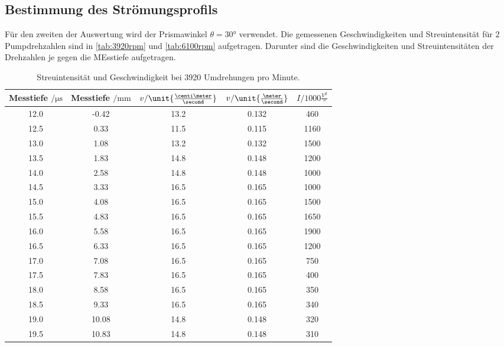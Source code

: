 \subsection{Bestimmung des Strömungsprofils}  
\label{sec:Profil}

Für den zweiten der Auswertung wird der Prismawinkel $\theta =30°$ verwendet. Die gemessenen Geschwindigkeiten und Streuintensität für 2 Pumpdrehzahlen sind in \autoref{tab:3920rpm} und \autoref{tab:6100rpm} aufgetragen.
Darunter sind die Geschwindigkeiten und Streuintensitäten der Drehzahlen je gegen die MEsstiefe aufgetragen.
 \begin{table}
     \centering
     \caption{Streuintensität und Geschwindigkeit bei 3920 Umdrehungen pro Minute.}
     \begin{tabular}{c c c c c}
         \toprule
         Messtiefe $ \mathrm{/} \unit{\micro \second}$ &  Messtiefe $ \mathrm{/} \unit{\milli \meter}$ & $v \mathrm{/} \unit{\frac{\centi \meter}{\second}}$ & $v \mathrm{/} \unit{\frac{\meter}{\second}}$ & $I \mathrm{/} 1000\unit{\frac{V^2}{\second}}$\\
         \midrule
         12.0 &  -0.42 &  13.2 &  0.132 &  460\\
         12.5 &  0.33 &  11.5 &  0.115 &  1160\\
         13.0 &  1.08 &  13.2 &  0.132 &  1500\\
         13.5 &  1.83 &  14.8 &  0.148 &  1200\\
         14.0 &  2.58 &  14.8 &  0.148 &  1000\\
         14.5 &  3.33 &  16.5 &  0.165 &  1000\\
         15.0 &  4.08 &  16.5 &  0.165 &  1500\\
         15.5 &  4.83 &  16.5 &  0.165 &  1650\\
         16.0 &  5.58 &  16.5 &  0.165 &  1900\\
         16.5 &  6.33 &  16.5 &  0.165 &  1200\\
         17.0 &  7.08 &  16.5 &  0.165 &  750\\
         17.5 &  7.83 &  16.5 &  0.165 &  400\\
         18.0 &  8.58 &  16.5 &  0.165 &  350\\
         18.5 &  9.33 &  16.5 &  0.165 &  340\\
         19.0 &  10.08 &  14.8 &  0.148 &  320\\
         19.5 &  10.83 &  14.8 &  0.148 &  310\\
         \bottomrule
     \end{tabular}
     \label{tab:3920rpm}
\end{table}
